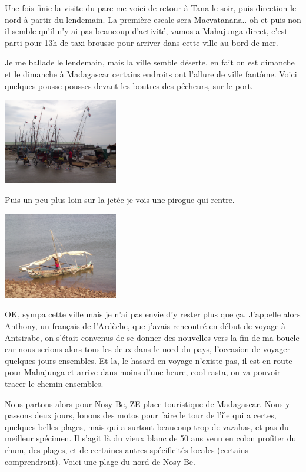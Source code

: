 \begin{multicols}{2}
Une fois finie la visite du parc me voici de retour à Tana le soir, puis direction le nord à partir du lendemain. La première escale sera Maevatanana.. oh et puis non il semble qu'il n'y ai pas beaucoup d'activité, vamos a Mahajunga direct, c'est parti pour 13h de taxi brousse pour arriver dans cette ville au bord de mer.

Je me ballade le lendemain, mais la ville semble déserte, en fait on est dimanche et le dimanche à Madagascar certains endroits ont l'allure de ville fantôme. Voici quelques pousse-pousses devant les boutres des pêcheurs, sur le port.

\smallbreak\smallbreak
\hspace*{-0.65cm}
\includegraphics[width=5cm]{articles/Une-boucle-du-cote-vert/DSCF0403.JPG}
\smallbreak

Puis un peu plus loin sur la jetée je vois une pirogue qui rentre.

\smallbreak\smallbreak
\hspace*{-0.65cm}
\includegraphics[width=5cm]{articles/Une-boucle-du-cote-vert/DSCF0398.JPG}
\smallbreak

OK, sympa cette ville mais je n'ai pas envie d'y rester plus que ça. J'appelle alors Anthony, un français de l'Ardèche, que j'avais rencontré en début de voyage à Antsirabe, on s'était convenus de se donner des nouvelles vers la fin de ma boucle car nous serions alors tous les deux dans le nord du pays, l'occasion de voyager quelques jours ensembles. Et la, le hasard en voyage n'existe pas, il est en route pour Mahajunga et arrive dans moins d'une heure, cool rasta, on va pouvoir tracer le chemin ensembles.

Nous partons alors pour Nosy Be, ZE place touristique de Madagascar. Nous y passons deux jours, louons des motos pour faire le tour de l'île qui a certes, quelques belles plages, mais qui a surtout beaucoup trop de vazahas, et pas du meilleur spécimen. Il s'agit là du vieux blanc de 50 ans venu en colon profiter du rhum, des plages, et de certaines autres spécificités locales (certains comprendront). Voici une plage du nord de Nosy Be.


\end{multicols}
